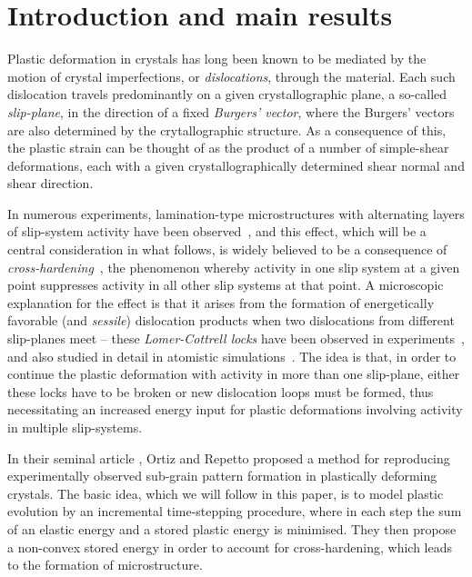 \documentclass[11pt,reqno]{amsart}
\theoremstyle{plain}
\theoremstyle{definition}
\theoremstyle{remark}
\newcommand{\EOR}{\color{black}}
\begin{document}
\section{Introduction and main results}

Plastic deformation in crystals has long been known to be mediated by the motion of crystal imperfections, or {\em dislocations}, through the material. Each such dislocation travels predominantly on a given crystallographic plane, a so-called {\em slip-plane}, in the direction of a fixed {\em Burgers' vector}, where the Burgers' vectors are also determined by the crytallographic structure. As a consequence of this, the plastic strain can be thought of as the product of a number of simple-shear deformations, each with a given crystallographically determined shear normal and shear direction.
  
In numerous experiments, lamination-type microstructures with alternating layers of slip-system activity have been observed~\cite{Rasmussen_80a, Jin_84a, Bay_92a,dm}, and this effect, which will be a central consideration in what follows, is widely believed to be a consequence of {\em cross-hardening}~\cite{ortiz,dm}, the phenomenon whereby activity in one slip system at a given point suppresses activity in all other slip systems at that point. A microscopic explanation for the effect is that it arises from the formation of energetically favorable (and \emph{sessile}) dislocation products when two dislocations from different slip-planes meet -- these {\em Lomer-Cottrell locks} have been observed in experiments~\cite{Lee_13}\EOR, and also studied in detail in atomistic simulations~\cite{Rodney:1999vs}. The idea is that, in order to continue the plastic deformation with activity in more than one slip-plane, either these locks have to be broken or new dislocation loops must be formed, thus necessitating an increased energy input for plastic deformations involving activity in multiple slip-systems.

In their seminal article \cite{ortiz}, Ortiz and Repetto  proposed a method for reproducing experimentally observed sub-grain pattern formation in plastically deforming crystals. The basic idea, which we will follow in this paper, is to model plastic evolution by an incremental time-stepping procedure, where in each step the sum of an elastic energy and a stored plastic energy is minimised. They then propose a non-convex stored energy in order to account for cross-hardening, which leads to the formation of microstructure.
\end{document}
